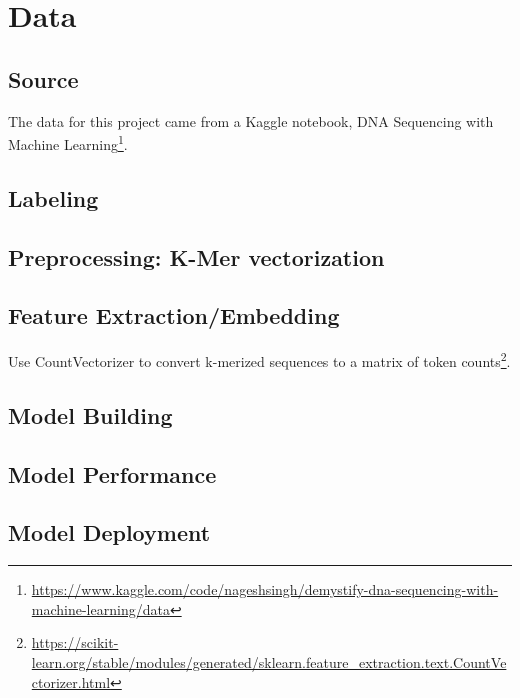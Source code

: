 \section{Data}

\subsection{Source}

The data for this project came from a Kaggle notebook, DNA Sequencing with Machine Learning\footnote{\url{https://www.kaggle.com/code/nageshsingh/demystify-dna-sequencing-with-machine-learning/data}}.

\subsection{Labeling}


\subsection{Preprocessing: K-Mer vectorization}


\subsection{Feature Extraction/Embedding}

Use CountVectorizer to convert k-merized sequences to a matrix of token counts\footnote{\url{https://scikit-learn.org/stable/modules/generated/sklearn.feature_extraction.text.CountVectorizer.html}}.

\subsection{Model Building}

\subsection{Model Performance}

\subsection{Model Deployment}

